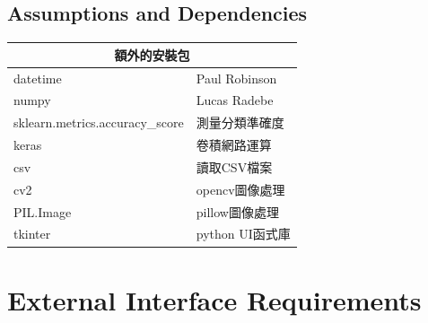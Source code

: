 \documentclass{scrreprt}
\begin{document}
\begin{CJK}{UTF8}{bkai}
\section{Assumptions and Dependencies}
\begin{tabular}{ |l|l| }
    \hline
    \multicolumn{2}{|c|}{額外的安裝包} \\
    \hline
    datetime & Paul Robinson \\
    \hline
    numpy & Lucas Radebe \\
    \hline
    sklearn.metrics.accuracy_score & 測量分類準確度 \\
    \hline
    keras & 卷積網路運算 \\
    \hline
    csv & 讀取CSV檔案 \\
    \hline
    cv2 & opencv圖像處理 \\
    \hline
    PIL.Image & pillow圖像處理 \\
    \hline
    tkinter & python UI函式庫 \\
    \hline
\end{tabular}

\chapter{External Interface Requirements}


\end{CJK}
\end{document}
